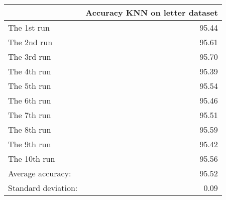 \begin{tabular}{lr}
\toprule
{} &  Accuracy KNN on letter dataset \\
\midrule
The 1st run         &                           95.44 \\
The 2nd run         &                           95.61 \\
The 3rd run         &                           95.70 \\
The 4th run         &                           95.39 \\
The 5th run         &                           95.54 \\
The 6th run         &                           95.46 \\
The 7th run         &                           95.51 \\
The 8th run         &                           95.59 \\
The 9th run         &                           95.42 \\
The 10th run        &                           95.56 \\
Average accuracy:   &                           95.52 \\
Standard deviation: &                            0.09 \\
\bottomrule
\end{tabular}
